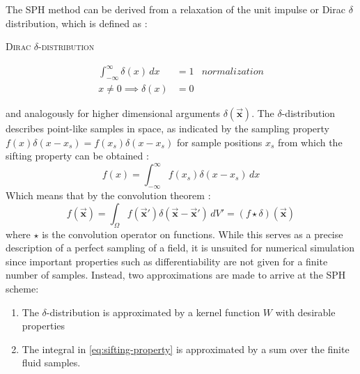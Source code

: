 \documentclass[oneside, a4paper]{book}
\newcommand{\equationnamed}[2]{%
  \setlength{\fboxsep}{2pt} %
  \setlength{\fboxrule}{0.01pt}
  \begin{center}
    \begin{minipage}{\textwidth}
      \begin{center}\textsc{#1}\end{center}
      #2
    \end{minipage}
  \end{center}
}
\newcommand\vek[1]{\vec{\bm{#1}}}
\newcommand\br[1]{\left(#1\right)}
\begin{document}
    The SPH method can be derived from a relaxation of the unit impulse or Dirac $\delta$ distribution, which is defined as \autocite{signal-processing-falaschi}:
    \equationnamed{Dirac $\delta$-distribution}{
      \vspace{-0.5cm}
      \begin{align}
        \int_{-\infty}^\infty\delta(x)\,dx &=1 &\textit{normalization}\\
        x\neq0 \implies \delta(x)&=0 &
      \end{align}  
    }
    and analogously for higher dimensional arguments $\delta\br{\vek  x}$. The $\delta$-distribution describes point-like samples in space, as indicated by the sampling property $f(x)\delta(x-x_s) = f(x_s)\delta(x-x_s)$ for sample positions $x_s$ from which the sifting property can be obtained \autocite{signal-processing-falaschi}:
    \begin{equation}\label{eq:sifting-property}
      f(x) = \int_{-\infty}^\infty f(x_s)\delta(x-x_s) \,dx
    \end{equation}
    Which means that by the convolution theorem \autocite{tutorial2019}:
    \begin{equation}
      f(\vek{x})  = \int_\Omega f(\vek{x}')\delta(\vek{x}-\vek{x}')\,dV' = (f\star \delta) (\vek{x})
    \end{equation}
    where $\star$ is the convolution operator on functions.
    While this serves as a precise description of a perfect sampling of a field, it is unsuited for numerical simulation since important properties such as differentiability are not given for a finite number of samples. Instead, two approximations are made to arrive at the SPH scheme:
    \begin{enumerate}
      \item The $\delta$-distribution is approximated by a kernel function $W$ with desirable properties
      \item The integral in \autoref{eq:sifting-property} is approximated by a sum over the finite fluid samples.
    \end{enumerate}
\end{document}
